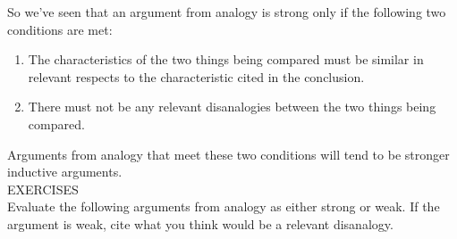 So we've seen that an argument from analogy is strong only if the following two
conditions are met:

\begin{enumerate}
\item The characteristics of the two things being compared must be similar
in relevant respects to the characteristic cited in the conclusion.
\item There must not be any relevant disanalogies between the two things
being compared.
\end{enumerate}

Arguments from analogy that meet these two conditions will tend to be stronger
inductive arguments. \\

EXERCISES \\

Evaluate the following arguments from analogy as either
strong or weak. If the argument is weak, cite what you think would be a
relevant disanalogy.

